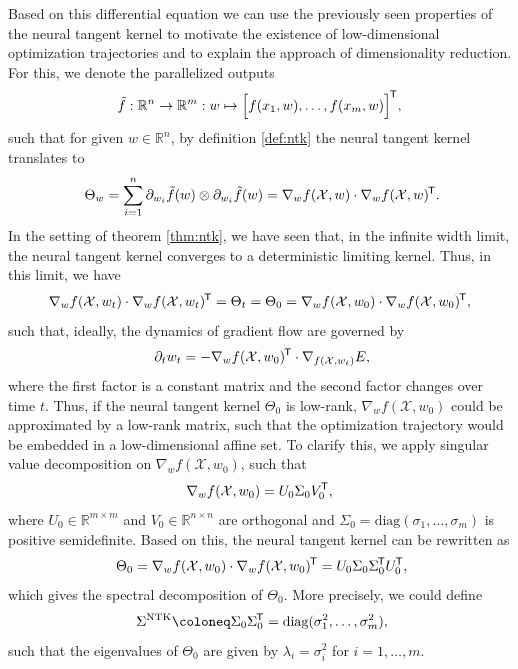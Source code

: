 \documentclass[11pt, a4paper]{article}
\newcommand{\R}{\mathbb{R}}
\newcommand{\X}{\mathcal{X}}
\newcommand*{\tr}{^{\mkern-1.5mu\mathsf{T}}}
\begin{document}
Based on this differential equation we can use the previously seen properties of the neural tangent kernel to motivate the existence of low-dimensional optimization trajectories and to explain the approach of dimensionality reduction. For this, we denote the parallelized outputs
\[ \tilde{f}: \R^{n} \to \R^m : w \mapsto \Big [ f(x_1,w), \dots, f(x_m,w) \Big ]\tr , \]
such that for given $w \in \R^n$, by definition \ref{def:ntk} the neural tangent kernel translates to
\[ \Theta_{w} = \sum_{i=1}^{n} \partial_{w_i} \tilde{f}(w) \otimes \partial_{w_i} \tilde{f}(w) = \nabla_wf(\X,w) \cdot \nabla_wf(\X,w)\tr. \]
In the setting of theorem \ref{thm:ntk}, we have seen that, in the infinite width limit, the neural tangent kernel converges to a deterministic limiting kernel. Thus, in this limit, we have
\[ \nabla_wf(\X,w_t) \cdot \nabla_wf(\X,w_t)\tr = \Theta_t = \Theta_0 = \nabla_wf(\X,w_0) \cdot \nabla_wf(\X,w_0)\tr, \] 
such that, ideally, the dynamics of gradient flow are governed by
\[ \partial_tw_t = - \nabla_w f(\X, w_0)\tr \cdot \nabla_{f(\X,w_t)} E, \]
where the first factor is a constant matrix and the second factor changes over time $t$. Thus, if the neural tangent kernel $\Theta_0$ is low-rank, $\nabla_wf(\X,w_0)$ could be approximated by a low-rank matrix, such that the optimization trajectory would be embedded in a low-dimensional affine set. To clarify this, we apply singular value decomposition on $\nabla_wf(\X,w_0)$, such that 
\[ \nabla_wf(\X,w_0) = U_0 \Sigma_0 V_0\tr , \]
where $U_0 \in \R^{m \times m}$ and $V_0 \in \R^{n \times n}$ are orthogonal and $\Sigma_0 = \text{diag}(\sigma_1, \dots, \sigma_m)$ is positive semidefinite. Based on this, the neural tangent kernel can be rewritten as
\[ \Theta_0 = \nabla_wf(\X,w_0) \cdot \nabla_wf(\X,w_0)\tr  = U_0 \Sigma_0 \Sigma_0\tr  U_0\tr, \]
which gives the spectral decomposition of $\Theta_0$. More precisely, we could define
\[ \Sigma^\text{NTK} \coloneq \Sigma_0 \Sigma_0 \tr = \text{diag}(\sigma_1^2, \dots, \sigma_m^2), \]
such that the eigenvalues of $\Theta_0$ are given by $\lambda_i = \sigma_i^2$ for $i=1, \dots, m$.
\end{document}

